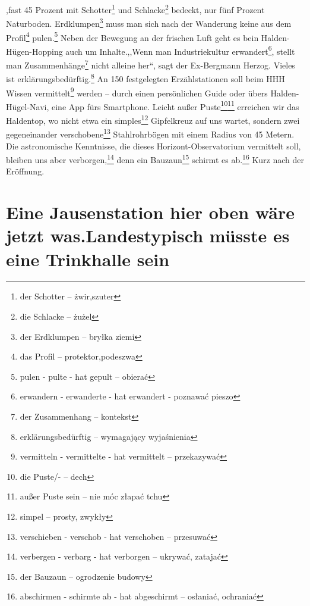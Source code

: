 \documentclass[twoside]{article}
\begin{document}
\begin{multicols}{2}
 ,fast 45 Prozent mit Schotter\footnote{der Schotter -- \.zwir,szuter} und Schlacke\footnote{die Schlacke -- \.zu\.zel} bedeckt, nur f\"unf Prozent Naturboden.
 Erdklumpen\footnote{der Erdklumpen -- bry\l{}ka ziemi} muss man sich nach der Wanderung keine aus dem Profil\footnote{das Profil -- protektor,podeszwa}
 pulen.\footnote{pulen - pulte - hat gepult -- obiera\'c}
 Neben der Bewegung an der frischen Luft geht es bein Halden-H\"ugen-Hopping auch um Inhalte.,,Wenn man Industriekultur
 erwandert\footnote{erwandern - erwanderte - hat erwandert - poznawa\'c pieszo}, stellt man Zusammenh\"ange\footnote{der Zusammenhang -- kontekst}
 nicht alleine her``, sagt der Ex-Bergmann Herzog.
 Vieles ist erkl\"arungsbed\"urftig.\footnote{erkl\"arungsbed\"urftig -- wymagaj\k{a}cy wyja\'snienia} An 150 festgelegten Erz\"ahlstationen soll beim HHH Wissen
 vermittelt\footnote{vermitteln - vermittelte - hat vermittelt -- przekazywa\'c} werden -- durch einen pers\"onlichen
 Guide oder \"ubers Halden-H\"ugel-Navi, eine App f\"urs Smartphone. Leicht au{\ss}er Puste\footnote{die Puste/- -- dech}\footnote{au{\ss}er Puste sein -- nie m\'oc
 z\l{}apa\'c tchu} erreichen wir das Haldentop, wo nicht etwa ein simples\footnote{simpel -- prosty, zwyk\l{}y}
 Gipfelkreuz auf uns wartet, sondern zwei gegeneinander verschobene\footnote{verschieben - verschob - hat verschoben -- przesuwa\'c} Stahlrohrb\"ogen mit einem
 Radius von 45 Metern. Die astronomische Kenntnisse, die dieses Horizont-Observatorium vermittelt soll, bleiben uns aber verborgen,\footnote{verbergen - verbarg - hat verborgen
 -- ukrywa\'c, zataja\'c} denn ein Bauzaun\footnote{der Bauzaun -- ogrodzenie budowy} schirmt es ab.\footnote{abschirmen - schirmte ab - hat abgeschirmt -- os\l{}ania\'c,
 ochrania\'c} Kurz nach der Er\"offnung.


 \section{Eine Jausenstation hier oben w\"are jetzt was.Landestypisch m\"usste es eine
 Trinkhalle sein}


\end{multicols}
\end{document}
